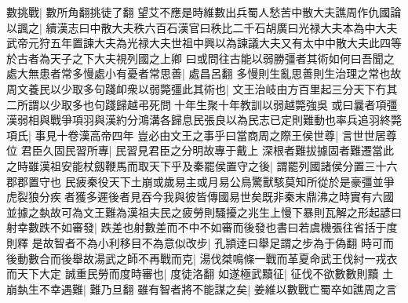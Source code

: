 數挑戰|{
	數所角翻挑徒了翻}
望艾不應是時維數出兵蜀人愁苦中散大夫譙周作仇國論以諷之|{
	續漢志曰中散大夫秩六百石漢官曰秩比二千石胡廣曰光禄大夫本為中大夫武帝元狩五年置諫大夫為光禄大夫世祖中興以為諫議大夫又有太中中散大夫此四等於古者為天子之下大夫視列國之上卿}
曰或問往古能以弱勝彊者其術如何曰吾聞之處大無患者常多慢處小有憂者常思善|{
	處昌呂翻}
多慢則生亂思善則生治理之常也故周文養民以少取多句踐卹衆以弱斃彊此其術也|{
	文王治岐由方百里起三分天下冇其二所謂以少取多也句踐歸越弔死問十年生聚十年教訓以弱越斃強吳}
或曰曩者項彊漢弱相與戰爭項羽與漢約分鴻溝各歸息民張良以為民志已定則難動也率兵追羽終斃項氏|{
	事見十卷漢高帝四年}
豈必由文王之事乎曰當商周之際王侯世尊|{
	言世世居尊位}
君臣久固民習所專|{
	民習見君臣之分明故專于戴上}
深根者難拔據固者難遷當此之時雖漢祖安能杖劔鞭馬而取天下乎及秦罷侯置守之後|{
	謂罷列國諸侯分置三十六郡郡置守也}
民疲秦役天下土崩或歲易主或月易公鳥驚獸駭莫知所從於是豪彊並爭虎裂狼分疾者獲多遲後者見吞今我與彼皆傳國易世矣既非秦末鼎沸之時實有六國並據之埶故可為文王難為漢祖夫民之疲勞則騷擾之兆生上慢下暴則瓦解之形起諺曰射幸數跌不如審發|{
	跌差也射數差而不中不如審而後發也書曰若虞機張往省括于度則釋}
是故智者不為小利移目不為意似改步|{
	孔頴逹曰舉足謂之步為于偽翻}
時可而後動數合而後舉故湯武之師不再戰而克|{
	湯伐桀鳴條一戰而革夏命武王伐紂一戎衣而天下大定}
誠重民勞而度時審也|{
	度徒洛翻}
如遂極武黷征|{
	征伐不欲數數則黷}
土崩埶生不幸遇難|{
	難乃旦翻}
雖有智者將不能謀之矣|{
	姜維以數戰亡蜀卒如譙周之言}



